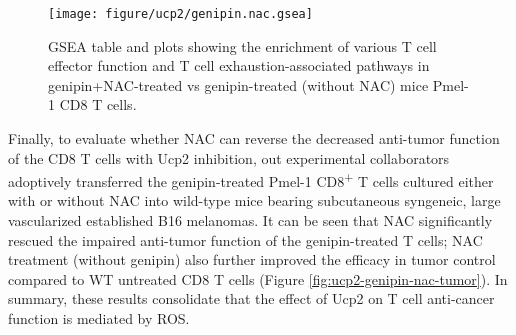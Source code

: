 \documentclass[12pt,twoside,openany,\mydriver]{thesis}  %
\begin{document}
\begin{table}

\caption{\label{tab:ucp2-genipin-nac-de}DE results of selected T cell differentiation and function marker genes in genipin+NAC-treated vs genipin-treated mice Pmel-1 CD8 T cells.}
\centering
{}
\end{table}
\begin{figure}
\texttt{[image: figure/ucp2/genipin.nac.gsea]} \caption{GSEA table and plots showing the enrichment of various T cell effector function and T cell exhaustion-associated pathways in genipin+NAC-treated vs genipin-treated (without NAC) mice Pmel-1 CD8 T cells.}\label{fig:ucp2-genipin-nac-gsea}
\end{figure}
Finally, to evaluate whether NAC can reverse the decreased anti-tumor function of the CD8 T cells with Ucp2 inhibition, out experimental collaborators adoptively transferred the genipin-treated Pmel-1 CD8\textsuperscript{+} T cells cultured either with or without NAC into wild-type mice bearing subcutaneous syngeneic, large vascularized established B16 melanomas. It can be seen that NAC significantly rescued the impaired anti-tumor function of the genipin-treated T cells; NAC treatment (without genipin) also further improved the efficacy in tumor control compared to WT untreated CD8 T cells (Figure \ref{fig:ucp2-genipin-nac-tumor}). In summary, these results consolidate that the effect of Ucp2 on T cell anti-cancer function is mediated by ROS.
\end{document}
